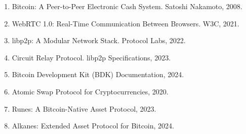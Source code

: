 \documentclass[11pt,a4paper]{article}
\begin{document}
\begin{enumerate}
    \item Bitcoin: A Peer-to-Peer Electronic Cash System. Satoshi Nakamoto, 2008.
    \item WebRTC 1.0: Real-Time Communication Between Browsers. W3C, 2021.
    \item libp2p: A Modular Network Stack. Protocol Labs, 2022.
    \item Circuit Relay Protocol. libp2p Specifications, 2023.
    \item Bitcoin Development Kit (BDK) Documentation, 2024.
    \item Atomic Swap Protocol for Cryptocurrencies, 2020.
    \item Runes: A Bitcoin-Native Asset Protocol, 2023.
    \item Alkanes: Extended Asset Protocol for Bitcoin, 2024.
\end{enumerate}
\end{document}
